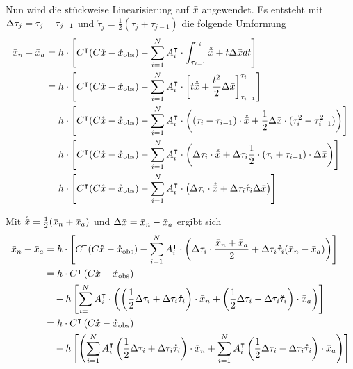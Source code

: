 Nun wird die stückweise Linearisierung auf $\bar{x}$ angewendet. Es entsteht mit $\Delta \tau_j=\tau_j-\tau_{j-1}$ und $\mathring \tau_j=\frac{1}{2}(\tau_j+\tau_{j-1})$ die folgende Umformung
\allowdisplaybreaks
\begin{align*}
\bar{x}_n - \bar{x}_a &= h\cdot \left[C^\intercal(C\mathring{x} -\mathring{x}_{\text{obs}}) - \sum_{i=1}^N A_i^\intercal \cdot \int_{\tau_{i-1}}^{\tau_{i}} \mathring{\bar{x}} + t\Delta \bar{x} dt\right]\\
		  &= h\cdot \left[C^\intercal(C\mathring{x} -\mathring{x}_{\text{obs}}) - \sum_{i=1}^N A_i^\intercal \cdot \left[t\mathring{\bar{x}} + \frac{t^2}{2}\Delta \bar{x} \right]_{\tau_{i-1}}^{\tau_i} \right]\\
		  &= h\cdot \left[C^\intercal(C\mathring{x} -\mathring{x}_{\text{obs}}) - \sum_{i=1}^N A_i^\intercal \cdot \left( (\tau_i - \tau_{i-1})\cdot \mathring{\bar{x}} + \frac{1}{2}\Delta \bar{x} \cdot(\tau_i^2-\tau_{i-1}^2) \right)\right]\\
		  &= h\cdot \left[C^\intercal(C\mathring{x} -\mathring{x}_{\text{obs}}) - \sum_{i=1}^N A_i^\intercal \cdot \left(\Delta \tau_i\cdot \mathring{\bar{x}} +  \Delta \tau_i \frac{1}{2}\cdot(\tau_i+\tau_{i-1})\cdot \Delta \bar{x} \right)\right]\\
		  &= h\cdot \left[C^\intercal(C\mathring{x} -\mathring{x}_{\text{obs}}) - \sum_{i=1}^N A_i^\intercal \cdot \left( \Delta \tau_i\cdot \mathring{\bar{x}} +  \Delta \tau_i \mathring{\tau}_i \Delta \bar{x} \right)\right]
\end{align*}

Mit $\mathring{\bar{x}} =\frac{1}{2}(\bar{x}_n + \bar{x}_a) $ und $\Delta \bar{x} =\bar{x}_n - \bar{x}_a $ ergibt sich
\allowdisplaybreaks
\begin{align*}
\bar{x}_n - \bar{x}_a &= h\cdot \left[C^\intercal(C\mathring{x} -\mathring{x}_{\text{obs}}) - \sum_{i=1}^N A_i^\intercal \cdot \left( \Delta \tau_i\cdot \frac{\bar{x}_n + \bar{x}_a}{2} +  \Delta \tau_i \mathring{\tau}_i (\bar{x}_n - \bar{x}_a) \right)\right]\\
 &= h\cdot C^\intercal\left(C\mathring{x} -\mathring{x}_{\text{obs}}\right) \\
 &\quad-h\left[\sum_{i=1}^N A_i^\intercal \cdot \left( \left(\frac{1}{2} \Delta \tau_i +\Delta \tau_i \mathring{\tau}_i\right) \cdot \bar{x}_n  +  \left(\frac{1}{2}\Delta \tau_i-\Delta \tau_i \mathring{\tau}_i\right) \cdot \bar{x}_a \right)\right]\\
 &= h\cdot C^\intercal\left(C\mathring{x} -\mathring{x}_{\text{obs}} \right)\\
 &\quad-h \left[\left( \sum_{i=1}^N A_i^\intercal \left(\frac{1}{2} \Delta \tau_i +\Delta \tau_i \mathring{\tau}_i\right) \cdot \bar{x}_n  + \sum_{i=1}^N A_i^\intercal  \left(\frac{1}{2}\Delta \tau_i-\Delta \tau_i \mathring{\tau}_i\right) \cdot \bar{x}_a \right)\right]\\
\end{align*}
 
